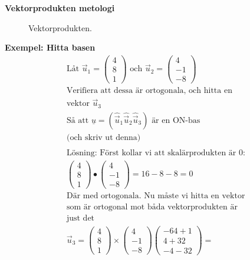 \begin{multicols}{2}
\textbf{Vektorprodukten metologi}
\begin{figure}[H]
    \centering
    
    \caption{Vektorprodukten.}
\end{figure}

\textbf{Exempel: Hitta basen}
\begin{align*} 
  &\text{Låt }
  \vec{u}_1 = \begin{pmatrix} 4 \\ 8 \\ 1 \end{pmatrix} \text{ och }
  \vec{u}_2 = \begin{pmatrix} 4 \\ -1 \\ -8 \end{pmatrix} \\
  &\text{Verifiera att dessa är ortogonala, och hitta en} \\
  &\text{vektor } \vec{u}_3 \\
  &\text{Så att } \underline{u} = (\hat\vec{u}_1 \hat\vec{u}_2 \hat\vec{u}_3)
  \text{ är en ON-bas } \\
  &\text{(och skriv ut denna)} \\
  &\\
  &\text{Lösning: Först kollar vi att skalärprodukten är } 0: \\
  &\begin{pmatrix} 4 \\ 8 \\ 1 \end{pmatrix} \bullet \begin{pmatrix} 4 \\ -1 \\ -8 \end{pmatrix}
  = 16-8-8=0 \\
  &\text{Där med ortogonala. Nu måste vi hitta en vektor} \\
  &\text{som är ortogonal mot båda vektorprodukten är} \\
  &\text{just det} \\
  &\vec{u}_3 =
  \begin{pmatrix} 4 \\ 8 \\ 1 \end{pmatrix} \times \begin{pmatrix} 4 \\ -1 \\ -8 \end{pmatrix}
  \begin{pmatrix} -64+1 \\ 4+32 \\ -4-32 \end{pmatrix} =

\end{align*}
\end{multicols}
